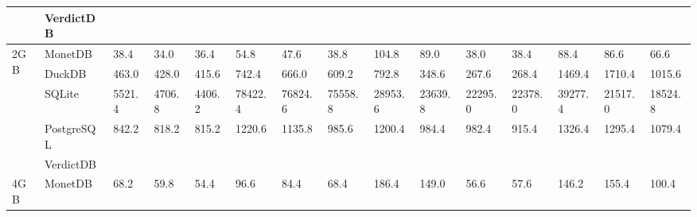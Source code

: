 \begin{table}[]
\begin{tabular}{ll|lllllllllllll}
                     & VerdictDB  &                         &                         &                         &                         &                         &                         &                         &                         &                         &                         &                         &                         &                         \\ \hline
\multirow{5}{*}{2GB} & MonetDB    & 38.4                    & 34.0                    & 36.4                    & 54.8                    & 47.6                    & 38.8                    & 104.8                   & 89.0                    & 38.0                    & 38.4                    & 88.4                    & 86.6                    & 66.6                    \\
                     & DuckDB     & 463.0                   & 428.0                   & 415.6                   & 742.4                   & 666.0                   & 609.2                   & 792.8                   & 348.6                   & 267.6                   & 268.4                   & 1469.4                  & 1710.4                  & 1015.6                  \\
                     & SQLite     & 5521.4                  & 4706.8                  & 4406.2                  & 78422.4                 & 76824.6                 & 75558.8                 & 28953.6                 & 23639.8                 & 22295.0                 & 22378.0                 & 39277.4                 & 21517.0                 & 18524.8                 \\
                     & PostgreSQL & 842.2                   & 818.2                   & 815.2                   & 1220.6                  & 1135.8                  & 985.6                   & 1200.4                  & 984.4                   & 982.4                   & 915.4                   & 1326.4                  & 1295.4                  & 1079.4                  \\
                     & VerdictDB  &                         &                         &                         &                         &                         &                         &                         &                         &                         &                         &                         &                         &                         \\ \hline
\multirow{5}{*}{4GB} & MonetDB    & 68.2                    & 59.8                    & 54.4                    & 96.6                    & 84.4                    & 68.4                    & 186.4                   & 149.0                   & 56.6                    & 57.6                    & 146.2                   & 155.4                   & 100.4                   \\

\end{tabular}
\end{table}
